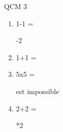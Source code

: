 \documentclass[a4paper, 11pt]{article}
\begin{document}
	\newpage
QCM 3\begin{enumerate}
			\item 1-1 =
			\begin{tabenum} [a)]
				-2
			\end{tabenum}
		\vspace{5mm}

			\item 1+1 =
			\begin{tabenum} [a)]
			\end{tabenum}
		\vspace{5mm}

			\item 5x5 =
			\begin{tabenum} [a)]
				\tabenumitem est impossible
			\end{tabenum}
		\vspace{5mm}

			\item 2+2 =
			\begin{tabenum} [a)]
				*2
			\end{tabenum}
		\vspace{5mm}
\end{enumerate}
\end{document}
